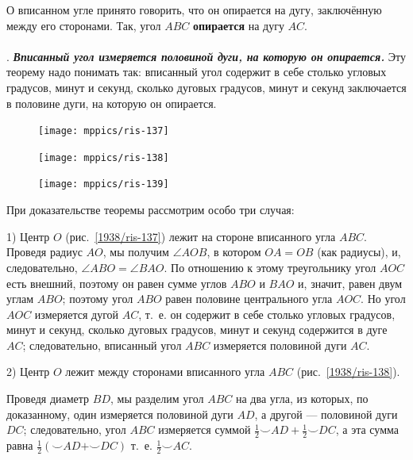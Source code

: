\documentclass[oneside]{book}
\begin{document}
О вписанном угле принято говорить, что он опирается на дугу, заключённую между его сторонами.
Так, угол $ABC$ \textbf{опирается} на дугу $AC$.

\paragraph{}\label{1938/124}
.
\textbf{\emph{Вписанный угол измеряется половиной дуги, на которую он опирается.}}
Эту теорему надо понимать так:
вписанный угол содержит в себе столько угловых градусов, минут и секунд, сколько дуговых градусов, минут и секунд заключается в половине дуги, на которую он опирается.

\begin{figure}[h]
\begin{minipage}{.32\textwidth}
\centering
\texttt{[image: mppics/ris-137]}
\caption{}\label{1938/ris-137}
\end{minipage}
\hfill
\begin{minipage}{.32\textwidth}
\centering
\texttt{[image: mppics/ris-138]}
\caption{}\label{1938/ris-138}
\end{minipage}
\hfill
\begin{minipage}{.32\textwidth}
\centering
\texttt{[image: mppics/ris-139]}
\caption{}\label{1938/ris-139}
\end{minipage}
\end{figure}

При доказательстве теоремы рассмотрим особо три случая:

1) Центр $O$ (рис.~\ref{1938/ris-137}) лежит на стороне вписанного угла $ABC$.
Проведя радиус $AO$, мы получим $\angle AOB$, в котором $OA = OB$ (как радиусы), и, следовательно, $\angle ABO=\angle BAO$.
По отношению к этому треугольнику угол $AOC$ есть внешний, поэтому он равен сумме углов $ABO$ и $BAO$ и, значит, равен двум углам $ABO$;
поэтому угол $ABO$ равен половине центрального угла $AOC$.
Но угол $AOC$ измеряется дугой $AC$, т.~е.
он содержит в себе столько угловых градусов, минут и секунд, сколько дуговых градусов, минут и секунд содержится в дуге $AC$;
следовательно, вписанный угол $ABC$ измеряется половиной дуги $AC$.

2) Центр $O$ лежит между сторонами вписанного угла $ABC$ (рис.~\ref{1938/ris-138}).

Проведя диаметр $BD$, мы разделим угол $ABC$ на два угла, из которых, по доказанному, один измеряется половиной дуги $AD$, а другой — половиной дуги $DC$;
следовательно, угол $ABC$ измеряется суммой
$\tfrac12{\smallsmile}AD+\tfrac12{\smallsmile}DC$, а эта сумма равна 
$\tfrac12({\smallsmile}AD+{\smallsmile}DC)$
т.~е.
$\tfrac12{\smallsmile}AC$.
\end{document}
